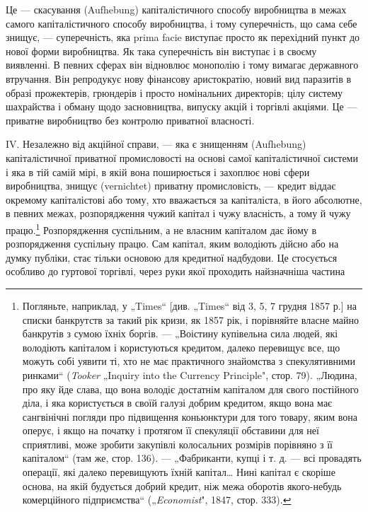Це — скасування (Aufhebung) капіталістичного способу виробництва
в межах самого капіталістичного способу виробництва,
і тому суперечність, що сама себе знищує, — суперечність, яка
prima facie виступає просто як перехідний пункт до нової
форми виробництва. Як така суперечність він виступає і в
своєму виявленні. В певних сферах він відновлює монополію і
тому вимагає державного втручання. Він репродукує нову фінансову аристократію, новий вид паразитів в
образі прожектерів,
грюндерів і просто номінальних директорів; цілу систему шахрайства і обману щодо засновництва,
випуску акцій і торгівлі акціями.
Це — приватне виробництво без контролю приватної власності.

IV. Незалежно від акційної справи, — яка є знищенням (Aufhebung) капіталістичної приватної
промисловості на основі самої
капіталістичної системи і яка в тій самій мірі, в якій вона поширюється і захоплює нові сфери
виробництва, знищує (vernichtet)
приватну промисловість, — кредит віддає окремому капіталістові
або тому, хто вважається за капіталіста, в його абсолютне, в
певних межах, розпорядження чужий капітал і чужу власність,
а тому й чужу працю.\footnote{
Погляньте, наприклад, у „Times“ [див. „Times“ від 3, 5, 7 грудня 1857 р.]
на списки банкрутств за такий рік кризи, як 1857 рік, і порівняйте власне майно
банкрутів з сумою їхніх боргів. — „Воістину купівельна сила людей, які володіють
капіталом і користуються кредитом, далеко перевищує все, що можуть собі уявити
ті, хто не має практичного знайомства з спекулятивними ринками“ (\emph{Tooker}
„Inquiry into the Currency Principle", стор. 79). „Людина, про яку йде слава, що
вона володіє достатнім капіталом для свого постійного діла, і яка користується в своїй галузі добрим
кредитом, якщо вона має сангвінічні погляди
про підвищення коньюнктури для того товару, яким вона оперує, і якщо на
початку і протягом її спекуляції обставини для неї сприятливі, може зробити
закупівлі колосальних розмірів порівняно з її капіталом“ (там же, стор. 136). —
 „Фабриканти, купці і т. д. — всі провадять операції, які далеко перевищують їхній
капітал\dots{} Нині капітал є скоріше основа, на якій будується добрий кредит,
ніж межа оборотів якого-небудь комерційного підприємства“ („\emph{Economist}", 1847,
стор. 333).
} Розпорядження суспільним, а не власним
капіталом дає йому в розпорядження суспільну працю. Сам капітал, яким володіють дійсно або на думку
публіки, стає тільки
основою для кредитної надбудови. Це стосується особливо до
гуртової торгівлі, через руки якої проходить найзначніша частина
